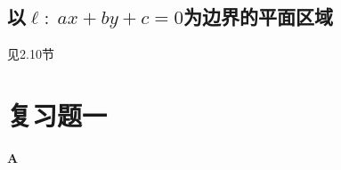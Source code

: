 \subsection{以$\ell:\; ax+by+c=0$为边界的平面区域}
见2.10节








































































































\section*{复习题一}
\begin{center}
    \bfseries A
\end{center}

